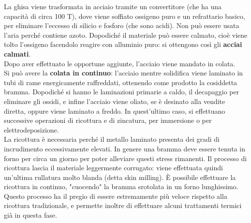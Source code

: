 La ghisa viene trasformata in acciaio tramite un convertitore (che ha una capacità di circa 100 T), dove viene soffiato ossigeno puro e un refrattario basico, per eliminare l’eccesso di silicio e fosforo (che sono acidi). Non può essere usata l’aria perché contiene azoto. Dopodiché il materiale può essere calmato, cioè viene tolto l’ossigeno facendolo reagire con alluminio puro: si ottengono così gli \textbf{acciai calmati}.\\
Dopo aver effettuato le opportune aggiunte, l’acciaio viene mandato in colata.\\
Si può avere la \textbf{colata in continuo}: l’acciaio mentre solidifica viene laminato in tubi di rame energicamente raffreddati, ottenendo come prodotto la cosiddetta bramma. Dopodiché si hanno le laminazioni primarie a caldo, il decapaggio per eliminare gli ossidi, e infine l’acciaio viene oliato, se è desinato alla vendite diretta, oppure viene laminato a freddo. In quest’ultimo caso, si effettuano successive operazioni di ricottura e di zincatura, per immersione o per elettrodeposizione.\\
La ricottura è necessaria perché il metallo laminato presenta dei gradi di incrudimento eccessivamente elevati. In genere una bramma deve essere tenuta in forno per circa un giorno per poter alleviare questi stress rimanenti. Il processo di ricottura lascia il materiale leggermente corrugato: viene effettuata quindi un'ultima rullatura molto blanda (detta skin milling). È possibile effettuare la ricottura in continuo, "cuocendo" la bramma srotolata in un forno lunghissimo. Questo processo ha il pregio di essere estremamente più veloce rispetto alla ricottura tradizionale, e permette inoltre di effettuare alcuni trattamenti termici già in questa fase.


